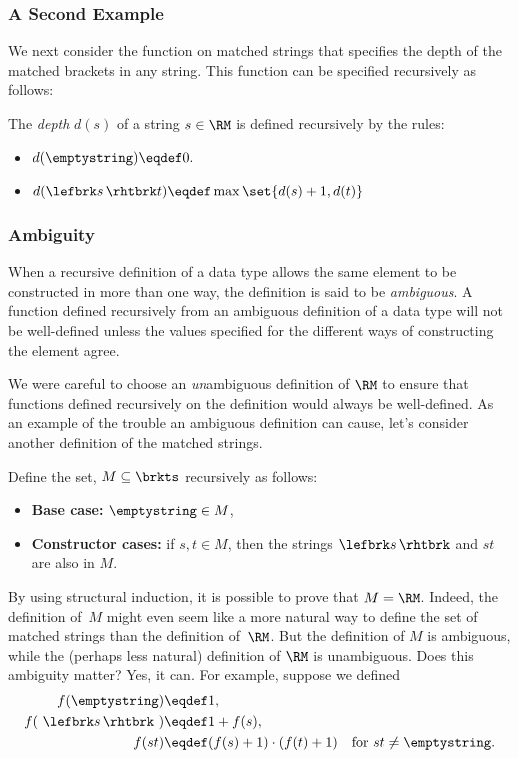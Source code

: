 \subsubsection{A Second Example}

We next consider the function on matched strings that specifies the
depth of the matched brackets in any string.  This function can be
specified recursively as follows:
\begin{definition}
The \emph{depth} $d(s)$ of a string $s \in\RM$ is defined
recursively by the rules:
\begin{itemize}
\item $d(\emptystring) \eqdef 0.$
\item $d(\lefbrk s\,\rhtbrk t)
    \eqdef \max \set{d(s) + 1, d(t)}$
\end{itemize}
\end{definition}

\subsubsection{Ambiguity}

When a recursive definition of a data type
allows the same element to be constructed in more than one way, the
definition is said to be \emph{ambiguous}.  A function defined recursively
from an ambiguous definition of a data type will not be well-defined
unless the values specified for the different ways of constructing the
element agree.

We were careful to choose an \emph{un}ambiguous definition of $\RM$ to
ensure that functions defined recursively on the definition would always
be well-defined.  As an example of the trouble an ambiguous definition can
cause, let's consider another definition of the matched strings.

\begin{definition}\label{M}
  Define the set, $M \subseteq \brkts$ recursively as follows:
\begin{itemize}

\item \textbf{Base case:} $\emptystring \in M$,

\item \textbf{Constructor cases:} if $s,t \in M$, then
  the strings $\lefbrk s\, \rhtbrk$ and $st$ are also in $M$.
\end{itemize}
\end{definition}

By using structural induction, it is possible to prove that $M =
\RM$.  Indeed, the definition of~$M$ might even seem like a more
natural way to define the set of matched strings than the definition
of~$\RM$.  But
the definition of $M$ is ambiguous, while the
(perhaps less natural) definition of $\RM$ is unambiguous.  Does this
ambiguity matter?
Yes, it can.  For example, suppose we defined
\begin{align*}
  f(\emptystring)        & \eqdef 1,\\
  f(\ \lefbrk s\,\rhtbrk\ ) & \eqdef 1+ f(s),\\
  f(st)                  & \eqdef (f(s)+1) \cdot (f(t)+1)
                            & \text{for } st\neq \emptystring.
\end{align*}

